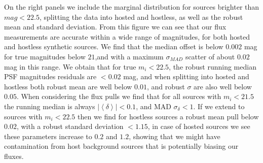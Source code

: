 On the right panels we include the marginal distribution for sources brighter than $mag < 22.5$, splitting the data into hosted and hostless, as well as the robust mean and standard deviation.
%
From this figure we can see that our \gls{flux} measurements are accurate within a wide range of magnitudes, for both hosted and hostless synthetic sources. We find that the median offset is below $0.002$ mag for true magnitudes below $21$,and with a maximum $\sigma_{MAD}$ scatter of about $0.02$ mag in this range. We obtain that for true $m_i < 22.5$, the robust running median PSF magnitudes residuals are $<0.02$ mag, and when splitting into hosted and hostless both robust mean are well below $0.01$, and robust $\sigma$ are also well below $0.05$.
%
When considering the \gls{flux} pulls we find that for all sources with $m_i<21.5$ the running median is always $|\left<\delta\right>| <0.1$, and MAD $\sigma_\delta < 1$. If we extend to sources with $m_i<22.5$ then we find for hostless sources a robust mean pull below $0.02$, with a robust standard deviation $<1.15$, in case of hosted sources we see these parameters increase to $0.2$ and $1.2$, showing that we might have contamination from host background sources that is potentially biasing our fluxes.
%
